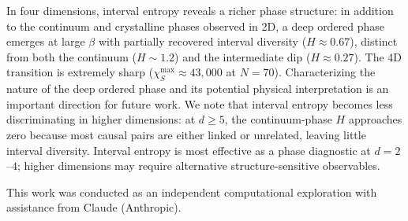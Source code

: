 \documentclass[aps,prd,twocolumn,superscriptaddress,nofootinbib]{revtex4-2}
\begin{document}
In four dimensions, interval entropy reveals a richer phase structure: in addition to the continuum and crystalline phases observed in 2D, a deep ordered phase emerges at large $\beta$ with partially recovered interval diversity ($H \approx 0.67$), distinct from both the continuum ($H \sim 1.2$) and the intermediate dip ($H \approx 0.27$). The 4D transition is extremely sharp ($\chi_S^{\max} \approx 43{,}000$ at $N = 70$). Characterizing the nature of the deep ordered phase and its potential physical interpretation is an important direction for future work. We note that interval entropy becomes less discriminating in higher dimensions: at $d \geq 5$, the continuum-phase $H$ approaches zero because most causal pairs are either linked or unrelated, leaving little interval diversity. Interval entropy is most effective as a phase diagnostic at $d = 2$--$4$; higher dimensions may require alternative structure-sensitive observables.

\begin{acknowledgments}
This work was conducted as an independent computational exploration with assistance from Claude (Anthropic).
\end{acknowledgments}
\end{document}
